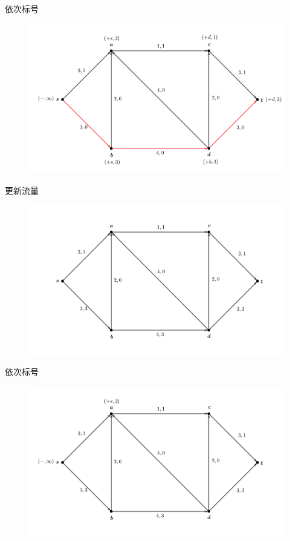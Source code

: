 \documentclass[lang = cn, scheme = chinese, thmcnt = section]{elegantbook}
\begin{document}
\begin{solution}
	依次标号
	\begin{figure}[H]
		\centering
		\includegraphics[scale = 0.15]{../图/13.2.5}
	\end{figure}
	更新流量
	\begin{figure}[H]
		\centering
		\includegraphics[scale = 0.15]{../图/13.2.6}
	\end{figure}
	
	依次标号
	\begin{figure}[H]
		\centering
		\includegraphics[scale = 0.15]{../图/13.2.7}
	\end{figure}
	

\end{solution}
\end{document}
